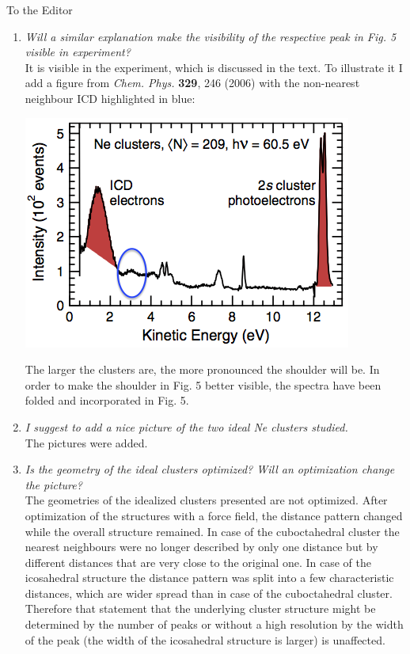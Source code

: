 \documentclass[DIN,pagenumber=false,parskip=half,fromalign=left,fromphone=true,fromemail=true,fromurl=false,fromlogo=false,fromrule=false]{scrlttr2}
\begin{document}
\begin{letter}{To the Editor}
\begin{enumerate}
 \item \emph{Will a similar explanation make the visibility of the respective peak in Fig. 5 visible in experiment?}\\
       It is visible in the experiment, which is discussed in the text. To illustrate
       it I add a figure from \emph{Chem. Phys.} \textbf{329}, 246 (2006) with
       the non-nearest neighbour ICD highlighted in blue:
       \begin{center}
        \includegraphics[]{../pics/exp_Ne_coinc_spec.png}
       \end{center}
       The larger the clusters are, the more pronounced the shoulder will be.
       In order to make the shoulder in Fig. 5 better visible, the spectra have
       been folded and incorporated in Fig. 5.

 \item \emph{I suggest to add a nice picture of the two ideal Ne clusters studied.}\\
       The pictures were added.

 \item \emph{Is the geometry of the ideal clusters optimized? Will an optimization change the picture?}\\
       The geometries of the idealized clusters presented are not optimized.
       After optimization of the structures with a force field, the distance pattern
       changed while the overall structure remained. In case of the cuboctahedral cluster
       the nearest neighbours were no longer described by only one distance but by
       different distances that are very close to the original one. In case of the
       icosahedral structure the distance pattern was split into a few characteristic
       distances, which are wider spread than in case of the cuboctahedral cluster.
       Therefore that statement that the underlying cluster structure might be
       determined by the number of peaks or without a high resolution by the width
       of the peak (the width of the icosahedral structure is larger) is unaffected.


\end{enumerate}
\end{letter}
\end{document}
